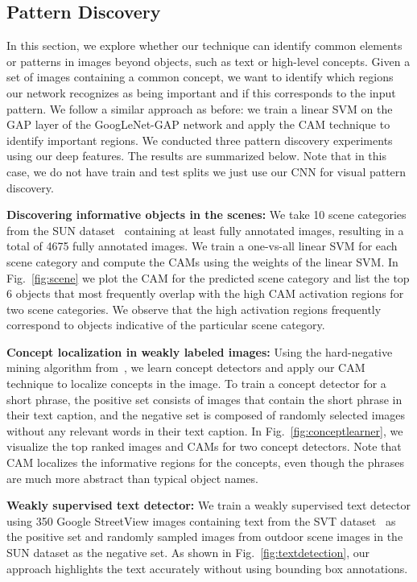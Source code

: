 \documentclass[10pt,twocolumn,letterpaper]{article}
\begin{document}
\subsection{Pattern Discovery}
\label{sec:pattern}

In this section, we explore whether our technique can identify common elements or patterns in images beyond objects, such as text or high-level concepts. Given a set of images containing a common concept, we want to identify which regions our network recognizes as being important and if this corresponds to the input pattern. We follow a similar approach as before: we train a linear SVM on the GAP layer of the GoogLeNet-GAP network and apply the CAM technique to identify important regions. We conducted three pattern discovery experiments using our deep features. The results are summarized below. Note that in this case, we do not have train and test splits  we just use our CNN for visual pattern discovery.






\textbf{Discovering informative objects in the scenes:} We take 10 scene categories from the SUN dataset~\cite{xiao2010sun} containing at least  fully annotated images, resulting in a total of 4675 fully annotated images. We train a one-vs-all linear SVM for each scene category and compute the CAMs using the weights of the linear SVM. In Fig.~\ref{fig:scene} we plot the CAM for the predicted scene category and list the top 6 objects that most frequently overlap with the high CAM activation regions for two scene categories. We observe that the high activation regions frequently correspond to objects indicative of the particular scene category.



\textbf{Concept localization in weakly labeled images:} Using the hard-negative mining algorithm from~\cite{zhou2014conceptlearner}, we learn concept detectors and apply our CAM technique to localize  concepts in the image. To train a concept detector for a short phrase, the positive set consists of  images that contain the short phrase in their text caption, and the negative set is composed of randomly selected images without any relevant words in their text caption. In Fig.~\ref{fig:conceptlearner}, we visualize the top ranked images and CAMs for two concept detectors. Note that CAM localizes the informative regions for the concepts, even though the phrases are much more abstract than typical object names.

\textbf{Weakly supervised text detector:} We train a weakly supervised text detector using 350 Google StreetView images containing text from the SVT dataset~\cite{wang2011end} as the positive set and randomly sampled images from outdoor scene images in the SUN dataset \cite{xiao2010sun} as the negative set. As shown in Fig.~\ref{fig:textdetection}, our approach highlights the text accurately without using bounding box annotations.
\end{document}
